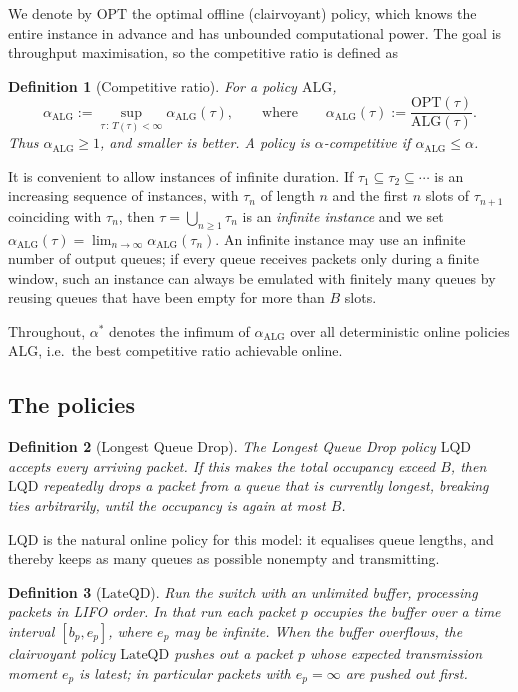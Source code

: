 \documentclass[10pt]{article}
\newtheorem{definition}{Definition}
\newcommand{\LQD}{\text{LQD}}
\newcommand{\LateQD}{\text{LateQD}}
\newcommand{\ALG}{\text{ALG}}
\newcommand{\OPT}{\text{OPT}}
\begin{document}
We denote by $\OPT$ the optimal offline (clairvoyant) policy, which knows the
entire instance in advance and has unbounded computational power. The goal is
throughput maximisation, so the competitive ratio is defined as

\begin{definition}[Competitive ratio]
For a policy $\ALG$,
\[
\alpha_{\ALG}
:=\sup_{\tau\,:\,T(\tau)<\infty}\alpha_{\ALG}(\tau),
\qquad\text{where}\qquad
\alpha_{\ALG}(\tau):=\frac{\OPT(\tau)}{\ALG(\tau)} .
\]
Thus $\alpha_{\ALG}\ge 1$, and smaller is better. A policy is
\emph{$\alpha$-competitive} if $\alpha_{\ALG}\le\alpha$.
\end{definition}

It is convenient to allow instances of infinite duration. If
$\tau_1\subseteq\tau_2\subseteq\cdots$ is an increasing sequence of instances,
with $\tau_n$ of length $n$ and the first $n$ slots of $\tau_{n+1}$ coinciding
with $\tau_n$, then $\tau=\bigcup_{n\ge 1}\tau_n$ is an \emph{infinite
instance} and we set
$\alpha_{\ALG}(\tau)=\lim_{n\to\infty}\alpha_{\ALG}(\tau_n)$. An infinite
instance may use an infinite number of output queues; if every queue receives
packets only during a finite window, such an instance can always be emulated
with finitely many queues by reusing queues that have been empty for more than
$B$ slots.

Throughout, $\alpha^{*}$ denotes the infimum of $\alpha_{\ALG}$ over all
deterministic online policies $\ALG$, i.e.\ the best competitive ratio
achievable online.

\subsection{The policies}

\begin{definition}[Longest Queue Drop]
The \emph{Longest Queue Drop} policy $\LQD$ accepts every arriving packet. If
this makes the total occupancy exceed $B$, then $\LQD$ repeatedly drops a
packet from a queue that is currently longest, breaking ties arbitrarily, until
the occupancy is again at most $B$.
\end{definition}

$\LQD$ is the natural online policy for this model: it equalises queue lengths,
and thereby keeps as many queues as possible nonempty and transmitting.

\begin{definition}[$\LateQD$]
Run the switch with an unlimited buffer, processing packets in LIFO order. In
that run each packet $p$ occupies the buffer over a time interval
$[b_p,e_p]$, where $e_p$ may be infinite. When the buffer overflows, the
clairvoyant policy $\LateQD$ pushes out a packet $p$ whose expected
transmission moment $e_p$ is latest; in particular packets with $e_p=\infty$
are pushed out first.
\end{definition}
\end{document}
